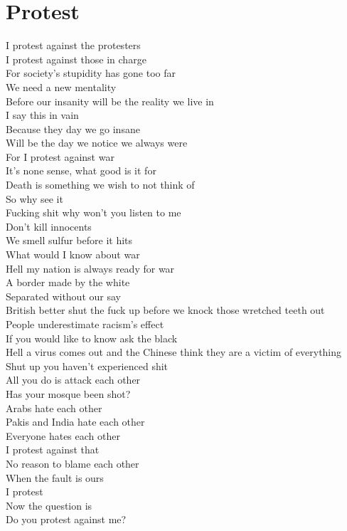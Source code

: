 \documentclass[12pt, b5paper]{article}
\begin{document}
\section{Protest}
\par I protest against the protesters
\\I protest against those in charge
\\For society's stupidity has gone too far
\\We need a new mentality
\\Before our insanity will be the reality we live in
\\I say this in vain
\\Because they day we go insane
\\Will be the day we notice we always were
\\For I protest against war
\\It's none sense, what good is it for
\\Death is something we wish to not think of
\\So why see it
\\Fucking shit why won't you listen to me
\\Don't kill innocents
\\We smell sulfur before it hits
\\What would I know about war
\\Hell my nation is always ready for war
\\A border made by the white
\\Separated without our say
\\British better shut the fuck up before we knock those wretched teeth out
\\People underestimate racism's effect
\\If you would like to know ask the black
\\Hell a virus comes out and the Chinese think they are a victim of everything
\\Shut up you haven't experienced shit
\\All you do is attack each other
\\Has your mosque been shot?
\\Arabs hate each other
\\Pakis and India hate each other
\\Everyone hates each other
\\I protest against that
\\No reason to blame each other
\\When the fault is ours
\\I protest
\\Now the question is
\\Do you protest against me? 
\end{document}
